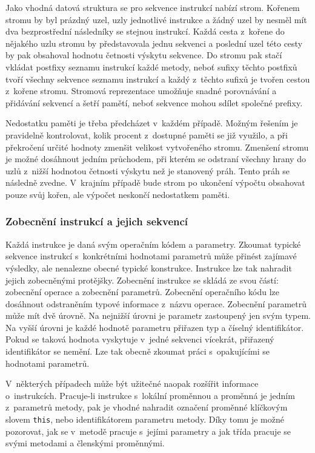 Jako vhodná datová struktura se pro sekvence instrukcí nabízí strom. Kořenem stromu by byl prázdný uzel, uzly jednotlivé instrukce a žádný uzel by nesměl mít dva bezprostřední následníky se stejnou instrukcí. Každá cesta z~kořene do nějakého uzlu stromu by představovala jednu sekvenci a poslední uzel této cesty by pak obsahoval hodnotu četnosti výskytu sekvence. Do stromu pak stačí vkládat postfixy seznamu instrukcí každé metody, neboť sufixy těchto postfixů tvoří všechny sekvence seznamu instrukcí a každý z~těchto sufixů je tvořen cestou z~kořene stromu. Stromová reprezentace umožňuje snadné porovnávání a přidávání sekvencí a šetří pamětí, neboť sekvence mohou sdílet společné prefixy.

Nedostatku paměti je třeba předcházet v~každém případě. Možným řešením je pravidelně kontrolovat, kolik procent z~dostupné paměti se již využilo, a při překročení určité hodnoty zmenšit velikost vytvořeného stromu. Zmenšení stromu je možné dosáhnout jedním průchodem, při kterém se odstraní všechny hrany do uzlů z~nižší hodnotou četnosti výskytu než je stanovený práh. Tento práh se následně zvedne. V~krajním případě bude strom po ukončení výpočtu obsahovat pouze svůj kořen, ale výpočet neskončí nedostatkem paměti.

\subsubsection{Zobecnění instrukcí a jejich sekvencí}

Každá instrukce je daná svým operačním kódem a parametry. Zkoumat typické sekvence instrukcí s~konkrétními hodnotami parametrů může přinést zajímavé výsledky, ale nenalezne obecné typické konstrukce. Instrukce lze tak nahradit jejich zobecněnými protějšky. Zobecnění instrukce se skládá ze svou částí: zobecnění operace a zobecnění parametrů. Zobecnění operačního kódu lze dosáhnout odstraněním typové informace z~názvu operace. Zobecnění parametrů může mít dvě úrovně. Na nejnižší úrovni je parametr zastoupený jen svým typem. Na vyšší úrovni je každé hodnotě parametru přiřazen typ a číselný identifikátor. Pokud se taková hodnota vyskytuje v~jedné sekvenci vícekrát, přiřazený identifikátor se nemění. Lze tak obecně zkoumat práci s~opakujícími se hodnotami parametrů.

V~některých případech může být užitečné naopak rozšířit informace o~instrukcích. Pracuje-li instrukce s~lokální proměnnou a proměnná je jedním z~parametrů metody, pak je vhodné nahradit označení proměnné klíčkovým slovem \texttt{this}, nebo identifikátorem parametru metody. Díky tomu je možné pozorovat, jak se v~metodě pracuje s~jejími parametry a jak třída pracuje se svými metodami a členskými proměnnými.

